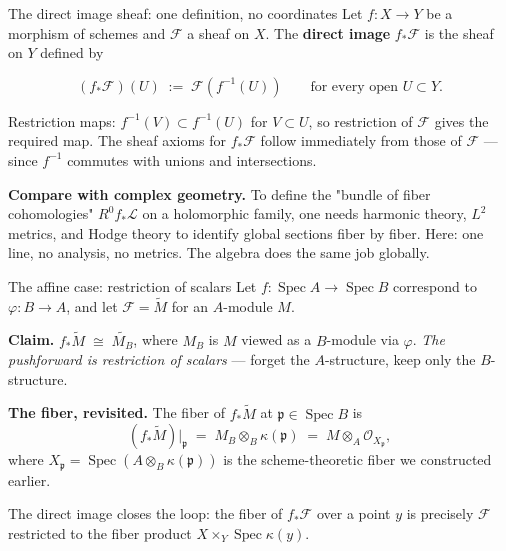 \documentclass[aspectratio=169,12pt]{beamer}
\newenvironment{mathbox}{%
  \begin{tcolorbox}[mathbox]}{%
  \end{tcolorbox}}
\begin{document}
\begin{frame}{The direct image sheaf: one definition, no coordinates}
  Let $f : X \to Y$ be a morphism of schemes and $\mathcal{F}$ a sheaf
  on $X$.
  The \textbf{direct image} $f_*\mathcal{F}$ is the sheaf on $Y$ defined by
  \begin{mathbox}
    \[
      (f_*\mathcal{F})(U) \;:=\; \mathcal{F}(f^{-1}(U))
      \qquad \text{for every open } U \subset Y.
    \]
  \end{mathbox}
  Restriction maps: $f^{-1}(V) \subset f^{-1}(U)$ for $V \subset U$,
  so restriction of $\mathcal{F}$ gives the required map.
  The sheaf axioms for $f_*\mathcal{F}$ follow immediately from those
  of $\mathcal{F}$ — since $f^{-1}$ commutes with unions and intersections.

  \medskip

  \textbf{Compare with complex geometry.}\enspace
  To define the "bundle of fiber cohomologies" $R^0 f_* \mathcal{L}$
  on a holomorphic family, one needs harmonic theory, $L^2$ metrics,
  and Hodge theory to identify global sections fiber by fiber.
  Here: one line, no analysis, no metrics.
  The algebra does the same job globally.
\end{frame}

\begin{frame}{The affine case: restriction of scalars}
  Let $f : \operatorname{Spec} A \to \operatorname{Spec} B$ correspond to
  $\varphi : B \to A$, and let $\mathcal{F} = \widetilde{M}$ for an
  $A$-module $M$.

  \medskip

  \textbf{Claim.}\enspace
  $f_*\widetilde{M} \;\cong\; \widetilde{M_B}$,
  where $M_B$ is $M$ viewed as a $B$-module via $\varphi$.
  \emph{The pushforward is restriction of scalars} — forget the
  $A$-structure, keep only the $B$-structure.

  \medskip

  \textbf{The fiber, revisited.}\enspace
  The fiber of $f_*\widetilde{M}$ at $\mathfrak{p} \in \operatorname{Spec} B$ is
  \[
    (f_*\widetilde{M})\big|_{\mathfrak{p}}
    \;=\; M_B \otimes_B \kappa(\mathfrak{p})
    \;=\; M \otimes_A \mathcal{O}_{X_{\mathfrak{p}}},
  \]
  where $X_{\mathfrak{p}} = \operatorname{Spec}(A \otimes_B \kappa(\mathfrak{p}))$
  is the scheme-theoretic fiber we constructed earlier.

  \medskip

  The direct image closes the loop:
  the fiber of $f_*\mathcal{F}$ over a point $y$ is precisely
  $\mathcal{F}$ restricted to the fiber product
  $X \times_Y \operatorname{Spec}\kappa(y)$.
\end{frame}
\end{document}
